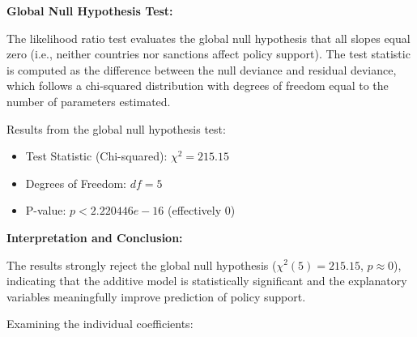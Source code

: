 \documentclass[12pt,letterpaper]{article}
\begin{document}
\noindent\textbf{Global Null Hypothesis Test:}

\noindent The likelihood ratio test evaluates the global null hypothesis that all slopes equal zero (i.e., neither countries nor sanctions affect policy support). The test statistic is computed as the difference between the null deviance and residual deviance, which follows a chi-squared distribution with degrees of freedom equal to the number of parameters estimated.

\noindent Results from the global null hypothesis test:
\begin{itemize}
	\item Test Statistic (Chi-squared): $\chi^2 = 215.15$
	\item Degrees of Freedom: $df = 5$
	\item P-value: $p < 2.220446e-16$ (effectively 0)
\end{itemize}

\noindent\textbf{Interpretation and Conclusion:}

\noindent The results strongly reject the global null hypothesis ($\chi^2(5) = 215.15$, $p \approx 0$), indicating that the additive model is statistically significant and the explanatory variables meaningfully improve prediction of policy support.

\noindent Examining the individual coefficients:
\end{document}
